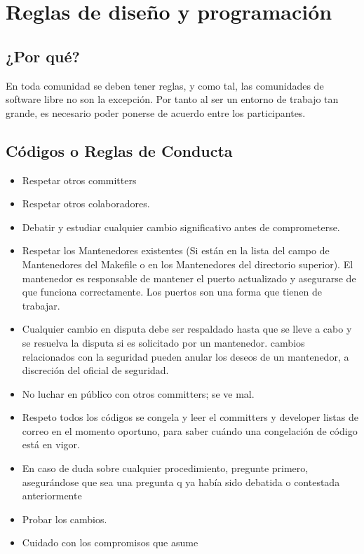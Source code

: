 \chapter{Reglas de diseño y programación}

\section{¿Por qué?}

{En toda comunidad se deben tener reglas, y como tal, las comunidades de software libre no son la excepción. Por tanto al ser un entorno de trabajo tan grande, es necesario poder ponerse de acuerdo entre los participantes.}

\section{Códigos o Reglas de Conducta}

\begin{itemize}
\item Respetar otros committers
\item Respetar otros colaboradores.
\item Debatir y estudiar cualquier cambio significativo antes de comprometerse.
\item Respetar los Mantenedores existentes (Si están en la lista del campo de Mantenedores del Makefile o en los Mantenedores del directorio superior).
El mantenedor es responsable de mantener el puerto actualizado y asegurarse de que funciona correctamente. Los puertos son una forma que tienen de trabajar.
\item Cualquier cambio en disputa debe ser respaldado hasta que se lleve a cabo y se resuelva la disputa si es solicitado por un mantenedor. cambios relacionados con la seguridad pueden anular los deseos de un mantenedor, a discreción del oficial de seguridad.
\item No luchar en público con otros committers; se ve mal.
\item Respeto todos los códigos se congela y leer el committers y developer listas de correo en el momento oportuno, para saber cuándo una congelación de código está en vigor.
\item En caso de duda sobre cualquier procedimiento, pregunte primero, asegurándose que sea una pregunta q ya había sido debatida o contestada anteriormente
\item Probar los cambios.
\item Cuidado con los compromisos que asume
\end{itemize}

